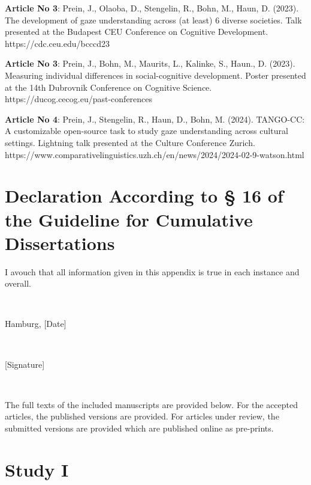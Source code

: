 \documentclass[
]{scrbook}
\begin{document}
\begin{hangparas}{5mm}{1}
\textbf{Article No 3}: Prein, J., Olaoba, D., Stengelin, R., Bohn, M., Haun, D. (2023). The development of gaze understanding across (at least) 6 diverse societies. Talk presented at the Budapest CEU Conference on Cognitive Development. https://cdc.ceu.edu/bcccd23

\textbf{Article No 3}: Prein, J., Bohn, M., Maurits, L., Kalinke, S., Haun., D. (2023). Measuring individual differences in social-cognitive development. Poster presented at the 14th Dubrovnik Conference on Cognitive Science. https://ducog.cecog.eu/past-conferences

\textbf{Article No 4}: Prein, J., Stengelin, R., Haun, D., Bohn, M. (2024). TANGO-CC: A customizable open-source task to study gaze understanding across cultural settings. Lightning talk presented at the Culture Conference Zurich. https://www.comparativelinguistics.uzh.ch/en/news/2024/2024-02-9-watson.html

\end{hangparas}

\newpage

\section*{Declaration According to § 16 of the Guideline for Cumulative Dissertations}\label{declaration-according-to-16-of-the-guideline-for-cumulative-dissertations}

I avouch that all information given in this appendix is true in each instance and overall.

~

Hamburg, {[}Date{]}

~

{[}Signature{]}

~

The full texts of the included manuscripts are provided below. For the accepted articles, the published versions are provided. For articles under review, the submitted versions are provided which are published online as pre-prints.

\newpage

\section*{Study I}\label{studyI}

\begin{minipage}{\textwidth}

\end{minipage}
\end{document}
